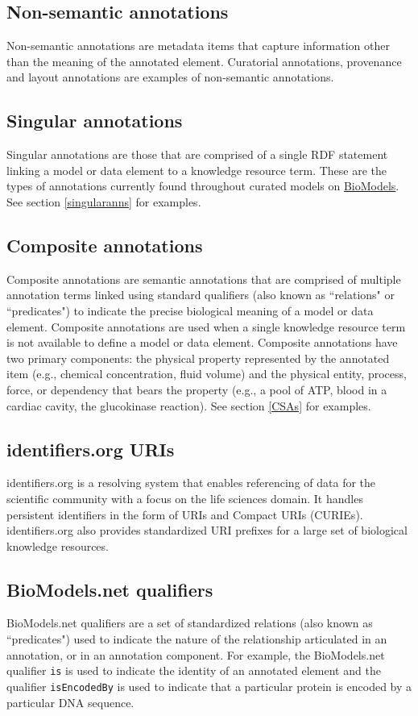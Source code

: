 \documentclass[pdftex,rgb,dvipsnames,svgnames,hyperref,table]{report}
\begin{document}
\subsection{Non-semantic annotations}
Non-semantic annotations are metadata items that capture information other than the meaning of the annotated element. Curatorial annotations, provenance and layout annotations are examples of non-semantic annotations.

\subsection{Singular annotations}
Singular annotations are those that are comprised of a single RDF statement linking a model or data element to a knowledge resource term. These are the types of annotations currently found throughout curated models on \href{http://www.ebi.ac.uk/biomodels/}{BioModels}. See section \ref{singularanns} for examples.

\subsection{Composite annotations}
Composite annotations are semantic annotations that are comprised of multiple annotation terms linked using standard qualifiers (also known as ``relations" or ``predicates") to indicate the precise biological meaning of a model or data element. Composite annotations are used when a single knowledge resource term is not available to define a model or data element. Composite annotations have two primary components: the physical property represented by the annotated item (e.g., chemical concentration, fluid volume) and the physical entity, process, force, or dependency that bears the property (e.g., a pool of ATP, blood in a cardiac cavity, the glucokinase reaction). See section \ref{CSAs} for examples.

\subsection{identifiers.org URIs}
identifiers.org \cite{identifiers2018} is a resolving system that enables referencing of data for the scientific community with a focus on the life sciences domain. It handles persistent identifiers in the form of URIs and Compact URIs (CURIEs). identifiers.org also provides standardized URI prefixes for a large set of biological knowledge resources.

\subsection{BioModels.net qualifiers}
BioModels.net qualifiers are a set of standardized relations (also known as ``predicates") used to indicate the nature of the relationship articulated in an annotation, or in an annotation component. For example, the BioModels.net qualifier \texttt{is} is used to indicate the identity of an annotated element and the qualifier \texttt{isEncodedBy} is used to indicate that a particular protein is encoded by a particular DNA sequence.
\end{document}
